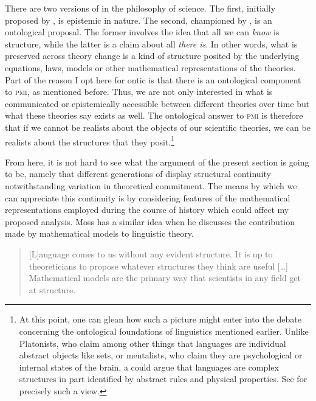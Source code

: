 \documentclass[output=paper]{langscibook}
\begin{document}
There are two versions of  in the philosophy of science. The first, initially proposed by \cite{Worall1989}, is epistemic in nature. The second, championed by \cite{French2003}, is an ontological proposal. The former involves the idea that all we can \emph{know} is structure, while the latter is a claim about all \emph{there is}. In other words, what is preserved across theory change is a kind of structure posited by the underlying equations, laws, models or other mathematical representations of the theories. Part of the reason I opt here for ontic  is that there is an ontological component to \textsc{pmi}, as mentioned before. Thus, we are not only interested in what is communicated or epistemically accessible between different theories over time but what these theories say exists as well. The ontological answer to \textsc{pmi} is therefore that if we cannot be realists about the objects of our scientific theories, we can be realists about the structures that they posit.\footnote{At this point, one can glean how such a picture might enter into the debate concerning the ontological foundations of linguistics mentioned earlier. Unlike Platonists, who claim among other things that languages are individual abstract objects like sets, or mentalists, who claim they are psychological or internal states of the brain, a  could argue that languages are complex structures in part identified by abstract rules and physical properties. See \cite{Nefdt:2018} for precisely such a view.}  

From here, it is not hard to see what the argument of the present section is going to be, namely that different generations of  display structural continuity notwithstanding variation in theoretical commitment. The means by which we can appreciate this continuity is by considering features of the mathematical representations employed during the course of history which could affect my proposed analysis. Moss has a similar idea when he discusses the contribution made by mathematical models to linguistic theory. 

\begin{quote}
[L]anguage comes to us without any evident structure. It is up to theoreticians to propose whatever structures they think are useful […] Mathematical models are the primary way that scientists in any field get at structure. \citep[534]{Moss2012}
\end{quote}
\end{document}
